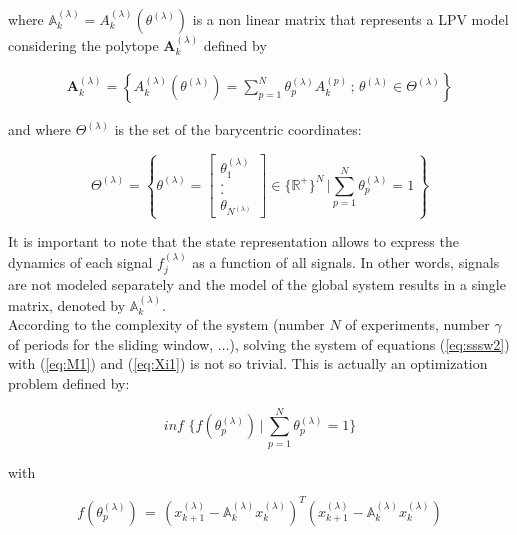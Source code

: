 \documentclass[letterpaper, 10 pt, conference]{ieeeconf}  %
\newcommand{\disp}{\displaystyle}
\newcommand{\mA}{{\mathbb A}}
\newcommand{\mR}{{\mathbb R}}
\begin{document}
where $\mA_k^{(\lambda)}=A_k^{(\lambda)}(\theta^{(\lambda)})$ is a non linear matrix that represents a LPV model considering the polytope $\textbf{A}_k^{(\lambda)}$ defined by
		 
		 \begin{equation}
		\label{eq:M1}
		\begin{array}{l}
		\textbf{A}_k^{(\lambda)}=\left\{ A_k^{(\lambda)}(\theta^{(\lambda)})=
		 \displaystyle \sum_{p=1}^{N}  \theta_p^{(\lambda)}A_k^{(p)} \,;\, \theta^{(\lambda)} \in\Theta^{(\lambda)} \right\}
		 \end{array}
		 \end{equation}
		
		and where $\Theta^{(\lambda)}$ is the set of the barycentric coordinates:
		
		\begin{equation}
		\label{eq:Xi1}
		\Theta^{(\lambda)}=\left\{ \theta^{(\lambda)} = \left[ \begin{array}{c} \theta_{1}^{(\lambda)}\\.\\.\\ \theta_{N^{(\lambda)}} \end{array} \right]
		\in \{\mR^+\}^{N}\,| \disp \sum_{p=1}^{N}\theta_p^{(\lambda)} = 1 \,\right\}
		 \end{equation}
		 
It is important to note that the state representation allows to express the dynamics of each signal $f_j^{(\lambda)}$ as a function of all signals. In other words, signals are not modeled separately and the model of the global system results in a single matrix, denoted by $\mA_k^{(\lambda)}$.\\

According to the complexity of the system (number $N$ of experiments, number $\gamma$ of periods for the sliding window, ...), solving the system of equations (\ref{eq:sssw2}) with (\ref{eq:M1}) and (\ref{eq:Xi1}) is not so trivial. This is actually an optimization problem defined by:

\begin{equation}
		\label{eq:opti}
		inf \,\, \{f(\theta_p^{(\lambda)})\,|\, \disp \sum_{p=1}^{N}\theta_p^{(\lambda)} = 1\}
		 \end{equation}

with 

\begin{equation}
		\label{eq:opti2}
		f(\theta_p^{(\lambda)})\,=\,\left( x_{k+1}^{(\lambda)}-\mA_k^{(\lambda)}x_{k}^{(\lambda)} \right)^T\left( x_{k+1}^{(\lambda)}-\mA_k^{(\lambda)}x_{k}^{(\lambda)} \right)
		 \end{equation}
\end{document}

